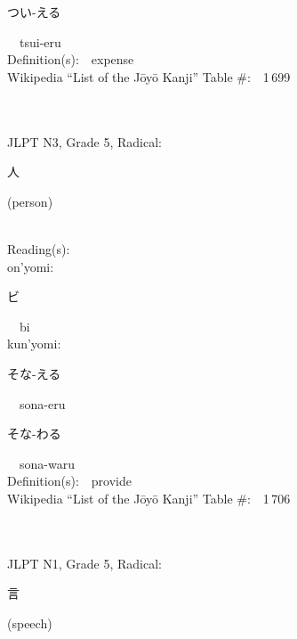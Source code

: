 \begin{multicols}{2}
{\hspace*{2em}}{\begin{CJK}{UTF8}{min} つい-える \end{CJK}}\ \ tsui-eru\ \ \\
Definition(s):\ \ expense \\
Wikipedia ``List of the J\=oy\=o Kanji'' Table \#:\ \ 1\,699 \\
\ \ \\
{\fontsize{34pt}{40pt}  }\ \ \\  %
{JLPT N3, Grade 5, Radical:\ \ {\begin{CJK}{UTF8}{min} 人 \end{CJK}} (person) } \\
Reading(s):\ \ \\
{\hspace*{1em}}on'yomi:\ \ \\
{\hspace*{2em}}{\begin{CJK}{UTF8}{min} ビ \end{CJK}}\ \ bi\ \ \\
{\hspace*{1em}}kun'yomi:\ \ \\
{\hspace*{2em}}{\begin{CJK}{UTF8}{min} そな-える \end{CJK}}\ \ sona-eru\ \ \\
{\hspace*{2em}}{\begin{CJK}{UTF8}{min} そな-わる \end{CJK}}\ \ sona-waru\ \ \\
Definition(s):\ \ provide \\
Wikipedia ``List of the J\=oy\=o Kanji'' Table \#:\ \ 1\,706 \\
\ \ \\
{\fontsize{34pt}{40pt}  }\ \ \\  %
{JLPT N1, Grade 5, Radical:\ \ {\begin{CJK}{UTF8}{min} 言 \end{CJK}} (speech) } \\

\end{multicols}
